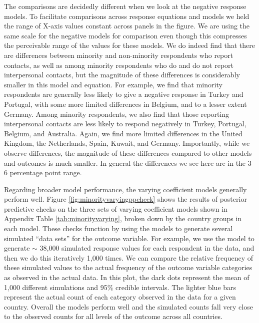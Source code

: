 The comparisons are decidedly different when we look at the negative response models. To facilitate comparisons across response equations and models we held the range of X-axis values constant across panels in the figure. We are using the same scale for the negative models for comparison even though this compresses the perceivable range of the values for these models.  We do indeed find that there are differences between minority and non-minority respondents who report contacts, as well as among minority respondents who do and do not report interpersonal contacts, but the magnitude of these differences is considerably smaller in this model and equation. For example, we find that minority respondents are generally less likely to give a negative response in Turkey and Portugal, with some more limited differences in Belgium, and to a lesser extent Germany. Among minority respondents, we also find that those reporting interpersonal contacts are less likely to respond negatively in Turkey, Portugal, Belgium, and Australia. Again, we find more limited differences in the United Kingdom, the Netherlands, Spain, Kuwait, and Germany. Importantly, while we observe differences, the magnitude of these differences compared to other models and outcomes is much smaller. In general the differences we see here are in the 3--6 percentage point range. 

Regarding broader model performance, the varying coefficient models generally perform well. Figure \ref{fig:minorityvaryingppcheck} shows the results of posterior predictive checks on the three sets of varying coefficient models shown in Appendix Table \ref{tab:minorityvarying}, broken down by the country groups in each model. These checks function by using the models to generate several simulated ``data sets'' for the outcome variable. For example, we use the model to generate $\sim$ 38,000 simulated response values for each respondent in the data, and then we do this iteratively 1,000 times. We can compare the relative frequency of these simulated values to the actual frequency of the outcome variable categories as observed in the actual data. In this plot, the dark dots represent the mean of 1,000 different simulations and 95\% credible intervals. The lighter blue bars represent the actual count of each category observed in the data for a given country. Overall the models perform well and the simulated counts fall very close to the observed counts for all levels of the outcome across all countries.




